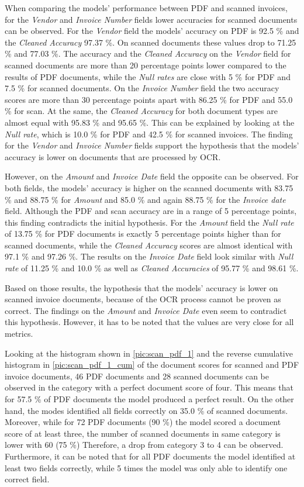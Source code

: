 When comparing the models' performance between PDF and scanned invoices, for the \textit{Vendor} and \textit{Invoice Number} fields lower accuracies for scanned documents can be observed. For the \textit{Vendor} field the models' accuracy on PDF is 92.5 \% and the \textit{Cleaned Accuracy} 97.37 \%. On scanned documents these values drop to 71.25 \% and 77.03 \%. The accuracy and the \textit{Cleaned Accuracy} on the \textit{Vendor} field for scanned documents are more than 20 percentage points lower compared to the results of PDF documents, while the \textit{Null rates} are close with 5 \% for PDF and 7.5 \% for scanned documents. On the \textit{Invoice Number} field the two accuracy scores are more than 30 percentage points apart with 86.25 \% for PDF and 55.0 \% for scan. At the same, the \textit{Cleaned Accuracy} for both document types are almost equal with 95.83 \% and 95.65 \%. This can be explained by looking at the \textit{Null rate}, which is 10.0 \% for PDF and 42.5 \% for scanned invoices. The finding for the \textit{Vendor} and \textit{Invoice Number} fields support the hypothesis that the models' accuracy is lower on documents that are processed by \ac{OCR}.

However, on the \textit{Amount} and \textit{Invoice Date} field the opposite can be observed. For both fields, the models' accuracy is higher on the scanned documents  with 83.75 \% and 88.75 \% for \textit{Amount} and 85.0 \% and again 88.75 \% for the \textit{Invoice date} field. Although the PDF and scan accuracy are in a range of 5 percentage points, this finding contradicts the initial hypothesis. For the \textit{Amount} field the \textit{Null rate} of 13.75 \% for PDF documents is exactly 5 percentage points higher than for scanned documents, while the \textit{Cleaned Accuracy} scores are almost identical with 97.1 \% and 97.26 \%. The results on the \textit{Invoice Date} field look similar with \textit{Null rate} of 11.25 \% and 10.0 \% as well as \textit{Cleaned Accuracies} of 95.77 \% and 98.61 \%.

Based on those results, the hypothesis that the models' accuracy is lower on scanned invoice documents, because of the \ac{OCR} process cannot be proven as correct. The findings on the \textit{Amount} and \textit{Invoice Date} even seem to contradict this hypothesis. However, it has to be noted that the values are very close for all metrics.

Looking at the histogram shown in \cref{pic:scan_pdf_1} and the reverse cumulative histogram in \cref{pic:scan_pdf_1_cum} of the document scores for scanned and PDF invoice documents, 46 PDF documents and 28 scanned documents can be observed in the category with a perfect document score of four. This means that for 57.5 \% of PDF documents the model produced a perfect result. On the other hand, the modes identified all fields correctly on 35.0 \% of scanned documents. 
Moreover, while for 72 PDF documents (90 \%) the model scored a document score of at least three, the number of scanned documents in same category is lower with 60 (75 \%)
Therefore, a drop from category 3 to 4 can be observed.
Furthermore, it can be noted that for all PDF documents the model identified at least two fields correctly, while 5 times the model was only able to identify one correct field. 

